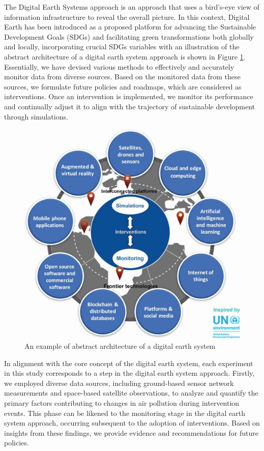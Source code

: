 The Digital Earth Systems approach is an approach that uses a bird's-eye view of information infrastructure to reveal the overall picture. In this context, Digital Earth has been introduced as a proposed platform for advancing the Sustainable Development Goals (SDGs) and facilitating green transformations both globally and locally, incorporating crucial SDGs variables \citep{fukui2021digital} with an illustration of the abstract architecture of a digital earth system approach is shown in Figure \ref{fig:chap2_fig7}. Essentially, we have devised various methods to effectively and accurately monitor data from diverse sources. Based on the monitored data from these sources, we formulate future policies and roadmaps, which are considered as interventions. Once an intervention is implemented, we monitor its performance and continually adjust it to align with the trajectory of sustainable development through simulations. \par
\begin{figure}[tbh!]
    \centering
    \includegraphics[width=\textwidth]{figs/chap2/digital_earth.jpg}
    \caption{An example of abstract architecture of a digital earth system \citep{fukui2021digital}}
    \label{fig:chap2_fig7}
\end{figure}

In alignment with the core concept of the digital earth system, each experiment in this study corresponds to a step in the digital earth system approach. Firstly, we employed diverse data sources, including ground-based sensor network measurements and space-based satellite observations, to analyze and quantify the primary factors contributing to changes in air pollution during intervention events. This phase can be likened to the monitoring stage in the digital earth system approach, occurring subsequent to the adoption of interventions. Based on insights from these findings, we provide evidence and recommendations for future policies. \par

